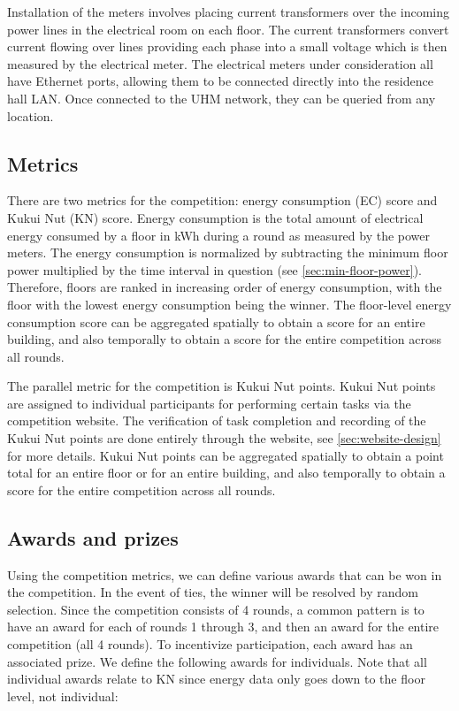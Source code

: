 Installation of the meters involves placing current transformers over the incoming power lines in the electrical room on each floor. The current transformers convert current flowing over lines providing each phase into a small voltage which is then measured by the electrical meter. The electrical meters under consideration all have Ethernet ports, allowing them to be connected directly into the residence hall LAN. Once connected to the UHM network, they can be queried from any location.

\subsection{Metrics}

There are two metrics for the competition: energy consumption (EC) score and Kukui Nut (KN) score. Energy consumption is the total amount of electrical energy consumed by a floor in kWh during a round as measured by the power meters. The energy consumption is normalized by subtracting the minimum floor power multiplied by the time interval in question (see \autoref{sec:min-floor-power}). Therefore, floors are ranked in increasing order of energy consumption, with the floor with the lowest energy consumption being the winner. The floor-level energy consumption score can be aggregated spatially to obtain a score for an entire building, and also temporally to obtain a score for the entire competition across all rounds.

The parallel metric for the competition is Kukui Nut points. Kukui Nut points are assigned to individual participants for performing certain tasks via the competition website. The verification of task completion and recording of the Kukui Nut points are done entirely through the website, see \autoref{sec:website-design} for more details. Kukui Nut points can be aggregated spatially to obtain a point total for an entire floor or for an entire building, and also temporally to obtain a score for the entire competition across all rounds.

\subsection{Awards and prizes}

Using the competition metrics, we can define various awards that can be won in the competition. In the event of ties, the winner will be resolved by random selection. Since the competition consists of 4 rounds, a common pattern is to have an award for each of rounds 1 through 3, and then an award for the entire competition (all 4 rounds). To incentivize participation, each award has an associated prize. We define the following awards for individuals. Note that all individual awards relate to KN since energy data only goes down to the floor level, not individual:

